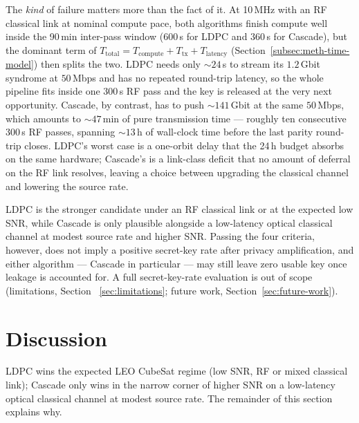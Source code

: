 \documentclass{UoYCSproject}
\begin{document}
The \emph{kind} of failure matters more than the fact of it. At 10\,MHz
with an RF classical link at nominal compute pace, both algorithms
finish compute well inside the 90\,min inter-pass window ($600$\,s for
LDPC and $360$\,s for Cascade), but the dominant term of
$T_{\text{total}} = T_{\text{compute}} + T_{\text{tx}} +
T_{\text{latency}}$ (Section~\ref{subsec:meth-time-model}) then splits
the two. LDPC needs only $\sim 24$\,s to stream its $1.2$\,Gbit
syndrome at $50$\,Mbps and has no repeated round-trip latency, so the whole pipeline fits inside one 300\,s RF
pass and the key is released at the very next opportunity. Cascade, by
contrast, has to push $\sim 141$\,Gbit at the same $50$\,Mbps, which
amounts to $\sim 47$\,min of pure transmission time --- roughly ten
consecutive 300\,s RF passes, spanning $\sim 13$\,h of wall-clock time
before the last parity round-trip closes. LDPC's worst case is a
one-orbit delay that the 24\,h budget absorbs on the same hardware;
Cascade's is a link-class deficit that no amount of deferral on the RF
link resolves, leaving a choice between upgrading the classical channel
and lowering the source rate.

LDPC is the stronger candidate under an RF classical link or at the
expected low SNR, while Cascade is only plausible alongside a
low-latency optical classical channel at modest source rate and higher
SNR. Passing the four criteria, however, does not imply a positive secret-key rate
after privacy amplification, and either algorithm --- Cascade in
particular --- may still leave zero usable
key once leakage is accounted for. A full secret-key-rate evaluation is
out of scope (limitations, Section~
\ref{sec:limitations}; future work, Section~\ref{sec:future-work}).

\section{Discussion}
\label{sec:discussion}


LDPC wins the expected LEO CubeSat regime (low SNR,
RF or mixed classical link); Cascade only wins in the narrow corner of
higher SNR on a low-latency optical classical channel at modest source
rate. The remainder of this section explains why.
\end{document}
